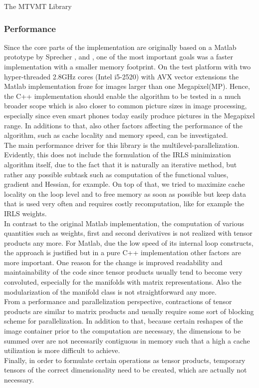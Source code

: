 \begin{chapter}{The MTVMT Library}
\subsubsection{Performance} %
\label{ssub:Performance}
Since the core parts of the implementation are originally based on a Matlab prototype by Sprecher \cite{SprecherIRLS}, \cite{manuel} and \cite{mara}, one of the most important
goals was a faster implementation with a smaller memory footprint. On the test platform with two hyper-threaded 2.8GHz cores (Intel i5-2520) with AVX vector extensions
the Matlab implementation froze for images larger than one Megapixel(MP). Hence, the C++ implementation should enable the algorithm to be tested in a much broader scope which is
also closer to common picture sizes in image processing, especially since even smart phones today easily produce pictures in the Megapixel range.
In additions to that, also other factors affecting the performance of the algorithm, such as cache locality and memory speed, can be investigated.\\

The main performance driver for this library is the multilevel-parallelization. Evidently, this does not include the formulation of the IRLS minimization algorithm itself, due to the fact that
it is naturally an iterative method, but rather any possible subtask such as computation of the functional values, gradient and Hessian, for example. On top of that, we tried to
maximize cache locality on the loop level and to free memory as soon as possible but keep data that is used very often and requires costly recomputation, like for example the IRLS weights.\\ 

In contrast to the original Matlab implementation, the computation of various quantities such as weights, first and second derivatives is not realized with tensor products any more.
For Matlab, due the low speed of its internal loop constructs, the approach is justified but in a pure C++ implementation other factors are more important.
One reason for the change is improved readability and maintainability of the code since tensor products usually tend to become very convoluted,
especially for the manifolds with matrix representations. Also the modularization of the manifold class is not straightforward any more.\\
From a performance and parallelization perspective, contractions of tensor products are similar to matrix products and usually require some sort of blocking scheme for parallelization.
In addition to that, because certain reshapes of the image container prior to the computation are necessary, the dimensions to be summed over are not necessarily contiguous in memory
such that a high a cache utilization is more difficult to achieve.\\
Finally, in order to formulate certain operations as tensor products, temporary tensors of the correct dimensionality need to be created, which are actually not necessary.\\


\end{chapter}
